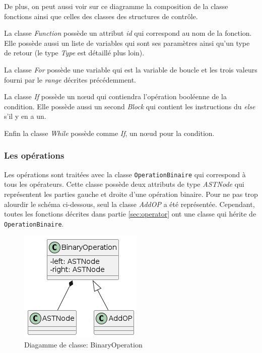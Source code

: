 \documentclass[a4paper]{article}%
\begin{document}
De plus, on peut aussi voir sur ce diagramme la composition de la classe
fonctions ainsi que celles des classes des structures de contrôle.

La classe \textit{Function} possède un attribut \textit{id} qui correspond au nom de la
fonction. Elle possède aussi un liste de variables qui sont ses paramètres ainsi
qu'un type de retour (le type \textit{Type} est détaillé plus loin).

La classe \textit{For} possède une variable qui est la variable de boucle et les
trois valeurs fourni par le \textit{range} décrites précédemment.

La classe \textit{If} possède un nœud qui contiendra l'opération booléenne de la
condition. Elle possède aussi un second \textit{Block} qui contient les
instructions du \textit{else} s'il y en a un.

Enfin la classe \textit{While} possède comme \textit{If}, un nœud pour la
condition.

\subsubsection*{Les opérations}

Les opérations sont traitées avec la classe \lstinline{OperationBinaire} qui
correspond à tous les opérateurs. Cette classe possède deux attributs de type
\textit{ASTNode} qui représentent les parties gauche et droite d'une opération
binaire. Pour ne pas trop alourdir le schéma ci-dessous, seul la classe
\textit{AddOP} a été représentée. Cependant, toutes les fonctions décrites dans
partie \ref{sec:operator} ont une classe qui hérite de
\lstinline{OperationBinaire}.
\clearpage

\begin{figure}[h!]
  \begin{center}
  \includegraphics[scale=0.5]{../ressources/diagrams/binaryOp.png}
  \caption{Diagamme de classe: BinaryOperation}
  \end{center}
\end{figure}
\end{document}
